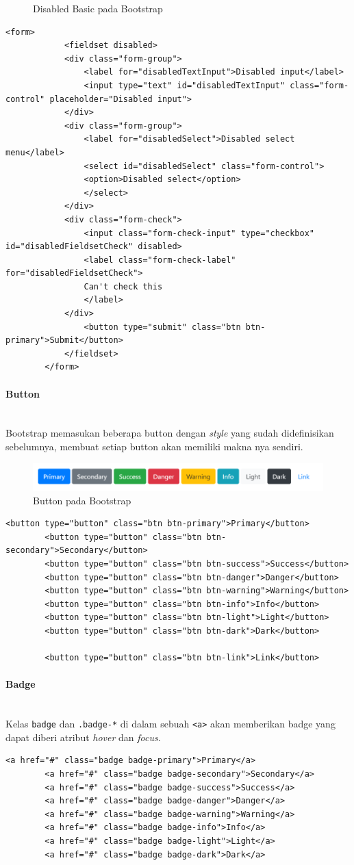 \documentclass[a4paper,twoside]{article}
\newcommand{\myparagraph}[1]{\paragraph{#1}\mbox{}\\}
\begin{document}
\begin{enumerate}
\begin{figure} [H]
			\caption{Disabled Basic pada Bootstrap} 
		\end{figure}
		\begin{lstlisting}[frame=single, basicstyle=\tiny] 
		<form>
			<fieldset disabled>
			<div class="form-group">
				<label for="disabledTextInput">Disabled input</label>
				<input type="text" id="disabledTextInput" class="form-control" placeholder="Disabled input">
			</div>
			<div class="form-group">
				<label for="disabledSelect">Disabled select menu</label>
				<select id="disabledSelect" class="form-control">
				<option>Disabled select</option>
				</select>
			</div>
			<div class="form-check">
				<input class="form-check-input" type="checkbox" id="disabledFieldsetCheck" disabled>
				<label class="form-check-label" for="disabledFieldsetCheck">
				Can't check this
				</label>
			</div>
				<button type="submit" class="btn btn-primary">Submit</button>
			</fieldset>
		</form>
		\end{lstlisting}
		\myparagraph{Button}
		Bootstrap memasukan beberapa button dengan \textit{style} yang sudah didefinisikan sebelumnya, membuat setiap button akan memiliki makna nya sendiri.
		\begin{figure} [H]
			\centering  
			\includegraphics[scale=0.7]{buttons_bootstrap.png}  
			\caption{Button pada Bootstrap} 
		\end{figure}
		\begin{lstlisting}[frame=single] 
		<button type="button" class="btn btn-primary">Primary</button>
		<button type="button" class="btn btn-secondary">Secondary</button>
		<button type="button" class="btn btn-success">Success</button>
		<button type="button" class="btn btn-danger">Danger</button>
		<button type="button" class="btn btn-warning">Warning</button>
		<button type="button" class="btn btn-info">Info</button>
		<button type="button" class="btn btn-light">Light</button>
		<button type="button" class="btn btn-dark">Dark</button>
		
		<button type="button" class="btn btn-link">Link</button>
		\end{lstlisting}
		
					
		\myparagraph{Badge}
		Kelas \colorbox{mygray}{\texttt{badge}} dan \colorbox{mygray}{\texttt{.badge-*}} di dalam sebuah \colorbox{mygray}{\texttt{<a>}} akan memberikan badge yang dapat diberi atribut \textit{hover} dan \textit{focus}. 
		\begin{lstlisting}[frame=single, basicstyle=\tiny]
		<a href="#" class="badge badge-primary">Primary</a>
		<a href="#" class="badge badge-secondary">Secondary</a>
		<a href="#" class="badge badge-success">Success</a>
		<a href="#" class="badge badge-danger">Danger</a>
		<a href="#" class="badge badge-warning">Warning</a>
		<a href="#" class="badge badge-info">Info</a>
		<a href="#" class="badge badge-light">Light</a>
		<a href="#" class="badge badge-dark">Dark</a>
		\end{lstlisting}
		

\end{enumerate}
\end{document}

